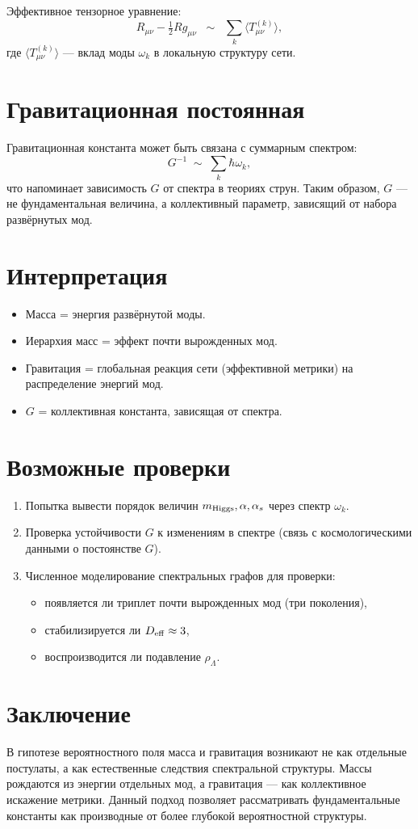 \documentclass[12pt,a4paper]{article}
\begin{document}
Эффективное тензорное уравнение:
\[
R_{\mu\nu} - \tfrac{1}{2} R g_{\mu\nu} \;\;\sim\;\; 
\sum_{k} \langle T_{\mu\nu}^{(k)} \rangle ,
\]
где $\langle T_{\mu\nu}^{(k)} \rangle$ --- вклад моды $\omega_k$ в локальную структуру сети.

\section{Гравитационная постоянная}
Гравитационная константа может быть связана с суммарным спектром:
\[
G^{-1} \;\sim\; \sum_{k} \hbar \omega_k ,
\]
что напоминает зависимость $G$ от спектра в теориях струн. Таким образом, $G$ --- не фундаментальная величина, а коллективный параметр, зависящий от набора развёрнутых мод.

\section{Интерпретация}
\begin{itemize}
  \item Масса = энергия развёрнутой моды.
  \item Иерархия масс = эффект почти вырожденных мод.
  \item Гравитация = глобальная реакция сети (эффективной метрики) на распределение энергий мод.
  \item $G$ = коллективная константа, зависящая от спектра.
\end{itemize}

\section{Возможные проверки}
\begin{enumerate}
  \item Попытка вывести порядок величин $m_{\rm Higgs}, \alpha, \alpha_s$ через спектр $\omega_k$.
  \item Проверка устойчивости $G$ к изменениям в спектре (связь с космологическими данными о постоянстве $G$).
  \item Численное моделирование спектральных графов для проверки: 
  \begin{itemize}
    \item появляется ли триплет почти вырожденных мод (три поколения),
    \item стабилизируется ли $D_{\rm eff}\approx 3$,
    \item воспроизводится ли подавление $\rho_\Lambda$.
  \end{itemize}
\end{enumerate}

\section{Заключение}
В гипотезе вероятностного поля масса и гравитация возникают не как отдельные постулаты, а как естественные следствия спектральной структуры. Массы рождаются из энергии отдельных мод, а гравитация --- как коллективное искажение метрики. Данный подход позволяет рассматривать фундаментальные константы как производные от более глубокой вероятностной структуры.
\end{document}
